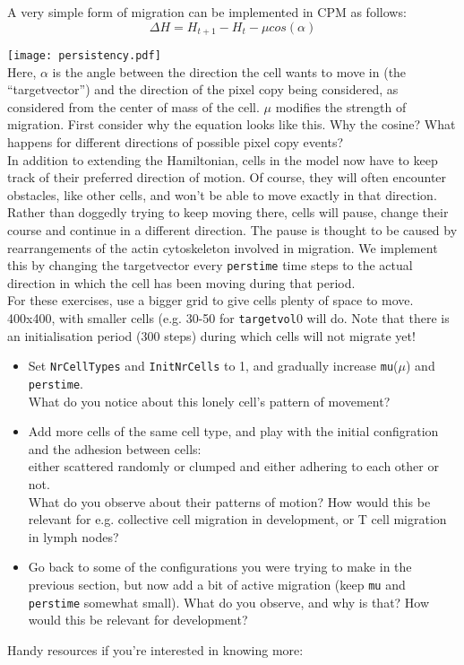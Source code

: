 \documentclass[a4paper,10pt]{article}
\begin{document}
A very simple form of migration can be implemented in CPM as follows:
$$\Delta H=H_{t+1} - H_{t} - \mu cos(\alpha)$$

\texttt{[image: persistency.pdf]}\\
Here, $\alpha$ is the angle between the direction the cell wants to move in (the ``targetvector'') and the direction of the pixel copy being 
considered, as considered from the center of mass of the cell. $\mu$ modifies the strength of migration. First consider why the equation 
looks like this. Why the cosine? What happens for different directions of possible pixel copy events?\\

In addition to extending the Hamiltonian, cells in the model now have to keep track of their preferred direction of motion. Of course, they will 
often encounter obstacles, like other cells, and won't be able to move exactly in that direction. Rather than doggedly trying to keep moving there, 
cells will pause, change their course and continue in a different direction. The pause is thought to be caused by rearrangements of the actin cytoskeleton involved in migration. 
We implement this by changing the targetvector every 
\texttt{perstime} time steps to the actual direction in which the cell has been moving during that period.\\

For these exercises, use a bigger grid to give cells plenty of space to move. 400x400, with smaller cells (e.g. 30-50 for \texttt{targetvol}0 will do. Note that there is an initialisation period (300 steps) during which cells will not migrate yet!
\begin{itemize}
 \item Set \texttt{NrCellTypes} and \texttt{InitNrCells} to 1, and gradually increase \texttt{mu}($\mu$) and \texttt{perstime}. \\What do you notice about 
this lonely cell's pattern of movement?
\item Add more cells of the same cell type, and play with the initial configration and the adhesion between cells:\\
 either scattered randomly or clumped and either adhering to each other or not. \\What do you observe about 
their patterns of motion? How would this be relevant for e.g. collective cell migration in development, or T cell migration in lymph nodes?
\item Go back to some of the configurations you were trying to make in the previous section, but now add a bit of active migration (keep \texttt{mu} 
and \texttt{perstime} somewhat small). What do you observe, and why is that? How would this be relevant for development?
\end{itemize}
\nocite{*}
\vspace*{1cm}
Handy resources if you're interested in knowing more:
 
 
\end{document}
